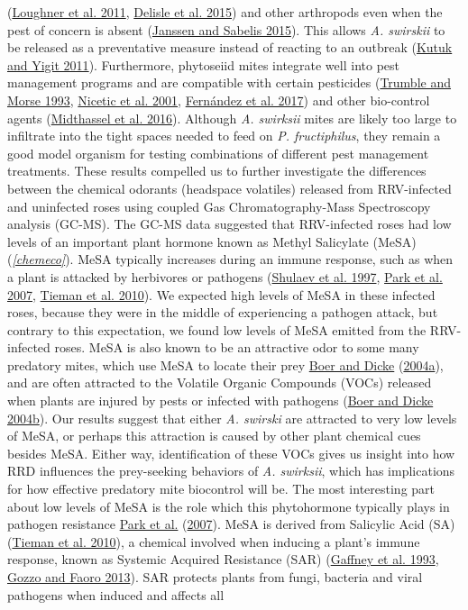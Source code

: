 \documentclass[12pt,final,CPage]{ufthesis}
\begin{document}
{(\protect\hyperlink{ref-Loughner2011}{Loughner et al. 2011}, \protect\hyperlink{ref-Delisle2015}{Delisle et al. 2015}) and other arthropods even when the pest of concern is absent (\protect\hyperlink{ref-Janssen2015}{Janssen and Sabelis 2015}). This allows \emph{A. swirskii} to be released as a preventative measure instead of reacting to an outbreak (\protect\hyperlink{ref-Kutuk2011}{Kutuk and Yigit 2011}). Furthermore, phytoseiid mites integrate well into pest management programs and are compatible with certain pesticides (\protect\hyperlink{ref-Trumble1993}{Trumble and Morse 1993}, \protect\hyperlink{ref-Nicetic2001}{Nicetic et al. 2001}, \protect\hyperlink{ref-Fernandez2017}{Fernández et al. 2017}) and other bio-control agents (\protect\hyperlink{ref-Midthassel2016}{Midthassel et al. 2016}). Although \emph{A. swirksii} mites are likely too large to infiltrate into the tight spaces needed to feed on \emph{P. fructiphilus}, they remain a good model organism for testing combinations of different pest management treatments. These results compelled us to further investigate the differences between the chemical odorants (headspace volatiles) released from RRV-infected and uninfected roses using coupled Gas Chromatography-Mass Spectroscopy analysis (GC-MS). The GC-MS data suggested that RRV-infected roses had low levels of an important plant hormone known as Methyl Salicylate (MeSA) (\emph{\ref{chemeco}}). MeSA typically increases during an immune response, such as when a plant is attacked by herbivores or pathogens (\protect\hyperlink{ref-Shulaev1997}{Shulaev et al. 1997}, \protect\hyperlink{ref-Park2007}{Park et al. 2007}, \protect\hyperlink{ref-Tieman2010}{Tieman et al. 2010}). We expected high levels of MeSA in these infected roses, because they were in the middle of experiencing a pathogen attack, but contrary to this expectation, we found low levels of MeSA emitted from the RRV-infected roses. MeSA is also known to be an attractive odor to some many predatory mites, which use MeSA to locate their prey \protect\hyperlink{ref-Boer2004a}{Boer and Dicke} (\protect\hyperlink{ref-Boer2004a}{2004a}), and are often attracted to the Volatile Organic Compounds (VOCs) released when plants are injured by pests or infected with pathogens (\protect\hyperlink{ref-Boer2004b}{Boer and Dicke 2004b}). Our results suggest that either \emph{A. swirski} are attracted to very low levels of MeSA, or perhaps this attraction is caused by other plant chemical cues besides MeSA. Either way, identification of these VOCs gives us insight into how RRD influences the prey-seeking behaviors of \emph{A. swirksii}, which has implications for how effective predatory mite biocontrol will be. The most interesting part about low levels of MeSA is the role which this phytohormone typically plays in pathogen resistance \protect\hyperlink{ref-Park2007}{Park et al.} (\protect\hyperlink{ref-Park2007}{2007}). MeSA is derived from Salicylic Acid (SA) (\protect\hyperlink{ref-Tieman2010}{Tieman et al. 2010}), a chemical involved when inducing a plant's immune response, known as Systemic Acquired Resistance (SAR) (\protect\hyperlink{ref-Gaffney1993}{Gaffney et al. 1993}, \protect\hyperlink{ref-Gozzo2013}{Gozzo and Faoro 2013}). SAR protects plants from fungi, bacteria and viral pathogens when induced and affects all }
\end{document}
